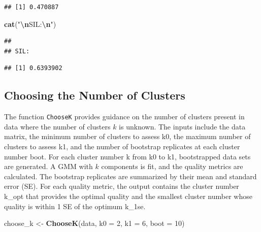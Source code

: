 \documentclass[12pt]{article}
\newenvironment{Shaded}{\begin{snugshade}}{\end{snugshade}}
\newcommand{\AttributeTok}[1]{\textcolor[rgb]{0.13,0.29,0.53}{#1}}
\newcommand{\DecValTok}[1]{\textcolor[rgb]{0.00,0.00,0.81}{#1}}
\newcommand{\FunctionTok}[1]{\textcolor[rgb]{0.13,0.29,0.53}{\textbf{#1}}}
\newcommand{\NormalTok}[1]{#1}
\newcommand{\OtherTok}[1]{\textcolor[rgb]{0.56,0.35,0.01}{#1}}
\newcommand{\SpecialCharTok}[1]{\textcolor[rgb]{0.81,0.36,0.00}{\textbf{#1}}}
\newcommand{\StringTok}[1]{\textcolor[rgb]{0.31,0.60,0.02}{#1}}
\begin{document}
\begin{verbatim}
## [1] 0.470887
\end{verbatim}

\begin{Shaded}
\begin{Highlighting}[]
\FunctionTok{cat}\NormalTok{(}\StringTok{"}\SpecialCharTok{\textbackslash{}n}\StringTok{SIL:}\SpecialCharTok{\textbackslash{}n}\StringTok{"}\NormalTok{)}
\end{Highlighting}
\end{Shaded}

\begin{verbatim}
## 
## SIL:
\end{verbatim}

\begin{Shaded}
\end{Shaded}

\begin{verbatim}
## [1] 0.6393902
\end{verbatim}

\hypertarget{choosing-the-number-of-clusters}{%
\subsection{Choosing the Number of
Clusters}\label{choosing-the-number-of-clusters}}

The function \texttt{ChooseK} provides guidance on the number of
clusters present in data where the number of clusters \(k\) is unknown.
The inputs include the data matrix, the minimum number of clusters to
assess k0, the maximum number of clusters to assess k1, and the number
of bootstrap replicates at each cluster number boot. For each cluster
number k from k0 to k1, bootstrapped data sets are generated. A GMM with
\(k\) components is fit, and the quality metrics are calculated. The
bootstrap replicates are summarized by their mean and standard error
(SE). For each quality metric, the output contains the cluster number
k\_opt that provides the optimal quality and the smallest cluster number
whose quality is within 1 SE of the optimum k\_1se.

\begin{Shaded}
\begin{Highlighting}[]
\NormalTok{choose\_k }\OtherTok{\textless{}{-}} \FunctionTok{ChooseK}\NormalTok{(data, }\AttributeTok{k0 =} \DecValTok{2}\NormalTok{, }\AttributeTok{k1 =} \DecValTok{6}\NormalTok{, }\AttributeTok{boot =} \DecValTok{10}\NormalTok{)}
\end{Highlighting}
\end{Shaded}
\end{document}

